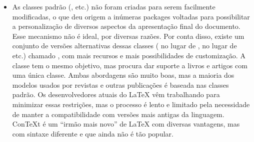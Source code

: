 \begin{itemize}
    \item As classes padrão (,  etc.) não foram criadas
    para serem facilmente modificadas, o que deu origem a inúmeras packages
    voltadas para possibilitar a personalização de diversos aspectos da
    apresentação final do documento. Esse mecanismo não é ideal, por diversas
    razões. Por conta disso, existe um conjunto de versões alternativas dessas
    classes ( no lugar de ,  no lugar de
     etc.) chamado , com mais recursos e mais
    possibilidades de customização. A classe  tem o mesmo objetivo,
    mas procura dar suporte a livros e artigos com uma única classe. Ambas
    abordagens são muito boas, mas a maioria dos modelos usados por revistas e
    outras publicações é baseada nas classes padrão. Os desenvolvedores atuais
    do \LaTeX{} vêm trabalhando para minimizar essas restrições, mas o processo
    é lento e limitado pela necessidade de manter a compatibilidade com versões
    mais antigas da linguagem. Con\TeX{}t é um ``irmão mais novo'' de \LaTeX{}
    com diversas vantagens, mas com sintaxe diferente e que ainda não é tão
    popular.
\end{itemize}
